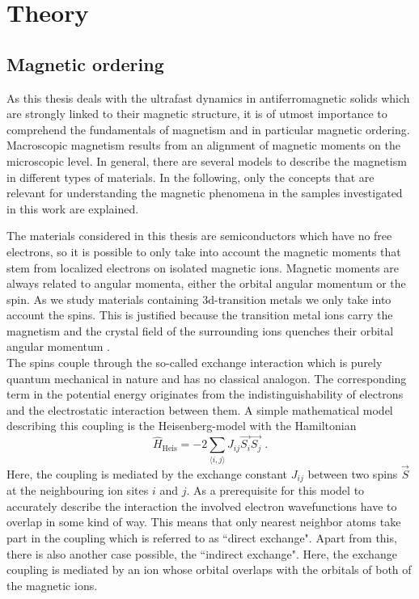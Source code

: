 \chapter{Theory}

\section{Magnetic ordering}
\label{sec:magnetic_ordering}
As this thesis deals with the ultrafast dynamics in antiferromagnetic solids which are strongly linked to their magnetic structure, it is of utmost importance to comprehend the fundamentals of magnetism and in particular magnetic ordering.
Macroscopic magnetism results from an alignment of magnetic moments on the microscopic level.
In general, there are several models to describe the magnetism in different types of materials.
In the following, only the concepts that are relevant for understanding the magnetic phenomena in the samples investigated in this work are explained.

The materials considered in this thesis are semiconductors which have no free electrons, so it is possible to only take into account the magnetic moments that stem from localized electrons on isolated magnetic ions.
Magnetic moments are always related to angular momenta, either the orbital angular momentum or the spin.
As we study materials containing 3d-transition metals we only take into account the spins.
This is justified because the transition metal ions carry the magnetism and the crystal field of the surrounding ions quenches their orbital angular momentum \cite{ogale_functional_2013}. \\
The spins couple through the so-called exchange interaction which is purely quantum mechanical in nature and has no classical analogon.
The corresponding term in the potential energy originates from the indistinguishability of electrons and the electrostatic interaction between them.
A simple mathematical model describing this coupling is the Heisenberg-model \cite{heisenberg_zur_1928} with the Hamiltonian
\begin{equation}
    \hat{H}_{\text{Heis}} = -2 \sum_{\langle i,j \rangle} J_{ij} \vec{S_i} \vec{S_j} \;.
\end{equation}
Here, the coupling is mediated by the exchange constant $J_{ij}$ between two spins $\vec{S}$ at the neighbouring ion sites $i$ and $j$.
As a prerequisite for this model to accurately describe the interaction the involved electron wavefunctions have to overlap in some kind of way.
This means that only nearest neighbor atoms take part in the coupling which is referred to as ``direct exchange".
Apart from this, there is also another case possible, the ``indirect exchange".
Here, the exchange coupling is mediated by an ion whose orbital overlaps with the orbitals of both of the magnetic ions.

